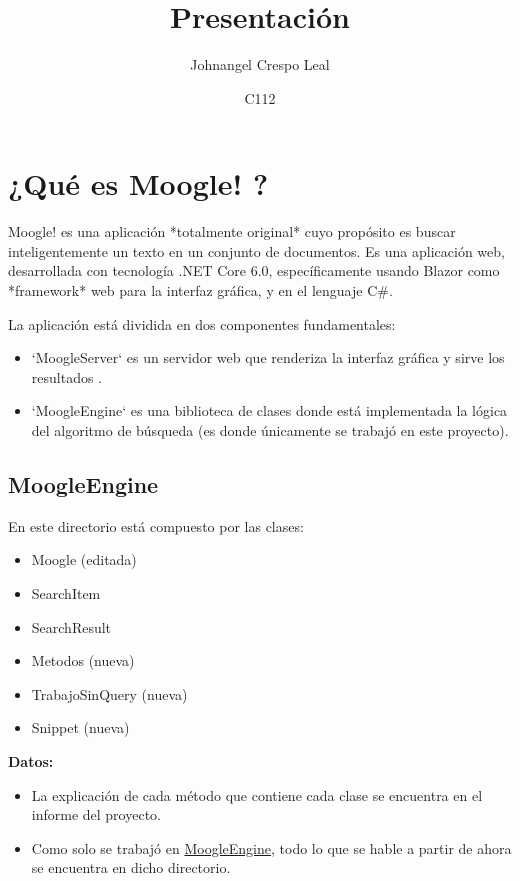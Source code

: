 \documentclass[a4paper,12pt]{article}
\begin{document}
\title{Presentación}
\author{Johnangel Crespo Leal}
\date{C112}
\maketitle

\section{¿Qué es Moogle! ?}\label{sec:?}
Moogle! es una aplicación *totalmente original* cuyo propósito es buscar inteligentemente un texto en un conjunto de documentos.
Es una aplicación web, desarrollada con tecnología .NET Core 6.0, específicamente usando Blazor como *framework* web para la interfaz gráfica, y en el lenguaje C\#. 

La aplicación está dividida en dos componentes fundamentales:

\begin{itemize}
    \item{`MoogleServer` es un servidor web que renderiza la interfaz gráfica y sirve los resultados .}
    \item{`MoogleEngine` es una biblioteca de clases donde está implementada la lógica del algoritmo de búsqueda (es donde únicamente se trabajó en este proyecto).}
\end{itemize}

\subsection{MoogleEngine}\label{sub:engine}
En este directorio está compuesto por las clases:
\begin{itemize}
    \item{Moogle (editada)}
    \item{SearchItem}
    \item{SearchResult}
    \item{Metodos (nueva)}
    \item{TrabajoSinQuery (nueva)}
    \item{Snippet (nueva)}
\end{itemize}

\textbf{Datos:} 
\begin{itemize}
    \item{La explicación de cada método que contiene cada clase se encuentra en el informe del proyecto.}
    \item{Como solo se trabajó en \underline{MoogleEngine}, todo lo que se hable a partir de ahora se encuentra en dicho directorio.}
\end{itemize}
\end{document}
